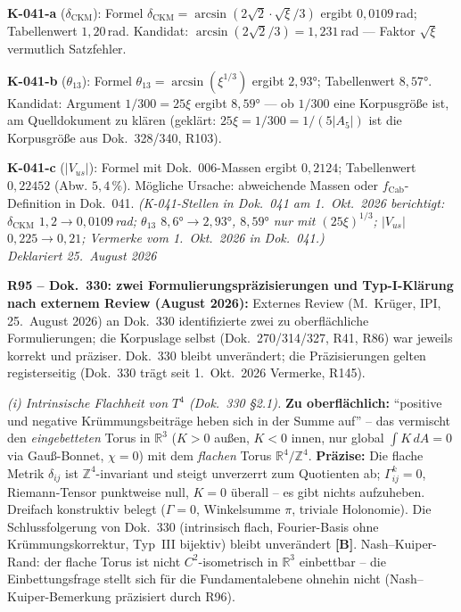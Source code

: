 \textbf{K-041-a} ($\delta_\mathrm{CKM}$):
Formel $\delta_\mathrm{CKM} = \arcsin(2\sqrt{2}\cdot\sqrt{\xi}/3)$
ergibt $0{,}0109$\,rad; Tabellenwert $1{,}20$\,rad.
Kandidat: $\arcsin(2\sqrt{2}/3) = 1{,}231$\,rad --- Faktor $\sqrt{\xi}$ vermutlich Satzfehler.

\textbf{K-041-b} ($\theta_{13}$):
Formel $\theta_{13} = \arcsin(\xi^{1/3})$ ergibt $2{,}93°$; Tabellenwert $8{,}57°$.
Kandidat: Argument $1/300 = 25\xi$ ergibt $8{,}59°$ ---
ob $1/300$ eine Korpusgröße ist, am Quelldokument zu klären (geklärt: $25\xi=1/300=1/(5|A_5|)$ ist die Korpusgröße aus Dok.~328/340, R103).

\textbf{K-041-c} ($|V_{us}|$):
Formel mit Dok.~006-Massen ergibt $0{,}2124$; Tabellenwert $0{,}22452$ (Abw. $5{,}4\,\%$).
Mögliche Ursache: abweichende Massen oder $f_\mathrm{Cab}$-Definition in Dok.~041. \emph{(K-041-Stellen in Dok.~041 am 1.~Okt.~2026 berichtigt: $\delta_\mathrm{CKM}$ $1{,}2\to0{,}0109$\,rad; $\theta_{13}$ $8{,}6°\to2{,}93°$, $8{,}59°$ nur mit $(25\xi)^{1/3}$; $|V_{us}|$ $0{,}225\to0{,}21$; Vermerke vom 1.~Okt.~2026 in Dok.~041.)}\\
\emph{Deklariert 25.~August 2026}

\medskip

\textbf{R95 -- Dok.~330: zwei Formulierungspräzisierungen und Typ-I-Klärung nach externem Review (August 2026):}
Externes Review (M.~Krüger, IPI, 25.~August 2026) an Dok.~330 identifizierte
zwei zu oberflächliche Formulierungen; die Korpuslage selbst
(Dok.~270/314/327, R41, R86) war jeweils korrekt und präziser.
Dok.~330 bleibt unverändert; die Präzisierungen gelten registerseitig (Dok.~330 trägt seit 1.~Okt.~2026 Vermerke, R145).

\emph{(i) Intrinsische Flachheit von $T^4$ (Dok.~330 §2.1).}
\textbf{Zu oberflächlich:} \enquote{positive und negative Krümmungsbeiträge
heben sich in der Summe auf} -- das vermischt den \emph{eingebetteten}
Torus in $\mathbb{R}^3$ ($K>0$ außen, $K<0$ innen, nur global
$\int K\,dA = 0$ via Gauß-Bonnet, $\chi=0$) mit dem \emph{flachen}
Torus $\mathbb{R}^4/\mathbb{Z}^4$.
\textbf{Präzise:} Die flache Metrik $\delta_{ij}$ ist
$\mathbb{Z}^4$-invariant und steigt unverzerrt zum Quotienten ab;
$\Gamma^k_{ij}=0$, Riemann-Tensor punktweise null, $K=0$ überall --
es gibt nichts aufzuheben. Dreifach konstruktiv belegt
($\Gamma=0$, Winkelsumme $\pi$, triviale Holonomie).
Die Schlussfolgerung von Dok.~330 (intrinsisch flach, Fourier-Basis
ohne Krümmungskorrektur, Typ~III bijektiv) bleibt unverändert
\textbf{[B]}. Nash--Kuiper-Rand: der flache Torus ist nicht $C^2$-isometrisch
in $\mathbb{R}^3$ einbettbar -- die Einbettungsfrage stellt sich für
die Fundamentalebene ohnehin nicht (Nash--Kuiper-Bemerkung präzisiert durch R96).

